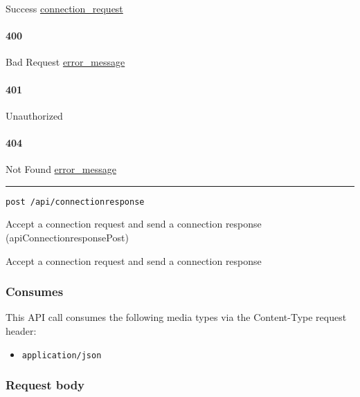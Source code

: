 Success \protect\hyperlink{connection_request}{connection\_request}

\hypertarget{section-376}{%
\paragraph{400}\label{section-376}}

Bad Request \protect\hyperlink{error_message}{error\_message}

\hypertarget{section-377}{%
\paragraph{401}\label{section-377}}

Unauthorized \protect\hyperlink{}{}

\hypertarget{section-378}{%
\paragraph{404}\label{section-378}}

Not Found \protect\hyperlink{error_message}{error\_message}

\begin{center}\rule{0.5\linewidth}{\linethickness}\end{center}

\protect\hypertarget{apiConnectionresponsePost}{}{}

\begin{verbatim}
post /api/connectionresponse
\end{verbatim}

Accept a connection request and send a connection response
({apiConnectionresponsePost})

Accept a connection request and send a connection response

\hypertarget{consumes-37}{%
\subsubsection{Consumes}\label{consumes-37}}

This API call consumes the following media types via the {Content-Type}
request header:

\begin{itemize}
\tightlist
\item
  \texttt{application/json}
\end{itemize}

\hypertarget{request-body-37}{%
\subsubsection{Request body}\label{request-body-37}}

